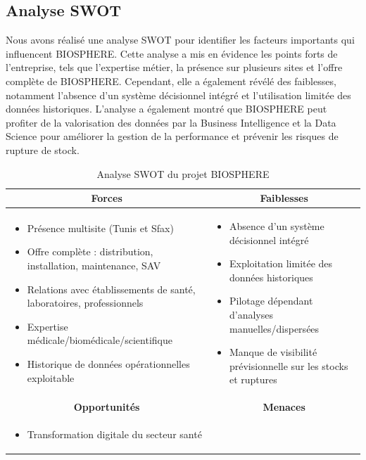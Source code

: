 \subsection{Analyse SWOT}
Nous avons réalisé une analyse SWOT pour identifier les facteurs importants qui influencent BIOSPHERE. Cette analyse a mis en évidence les points forts de l'entreprise, tels que l'expertise métier, la présence sur plusieurs sites et l'offre complète de BIOSPHERE. Cependant, elle a également révélé des faiblesses, notamment l'absence d'un système décisionnel intégré et l'utilisation limitée des données historiques. 
L'analyse a également montré que BIOSPHERE peut profiter de la valorisation des données par la Business Intelligence et la Data Science pour améliorer la gestion de la performance et prévenir les risques de rupture de stock.
\begin{table}[H]
\centering
\caption{Analyse SWOT du projet BIOSPHERE}
\label{tab:ch1:swot}
\begin{tabular}{|p{6.5cm}|p{6.5cm}|}
\hline
\multicolumn{1}{|c|}{\textbf{Forces}} & 
\multicolumn{1}{c|}{\textbf{Faiblesses}} \\ 
\hline
\begin{itemize}
    \item Présence multisite (Tunis et Sfax)
    \item Offre complète : distribution, installation, maintenance, SAV
    \item Relations avec établissements de santé, laboratoires, professionnels
    \item Expertise médicale/biomédicale/scientifique
    \item Historique de données opérationnelles exploitable
\end{itemize} & 
\begin{itemize}
    \item Absence d'un système décisionnel intégré
    \item Exploitation limitée des données historiques
    \item Pilotage dépendant d'analyses manuelles/dispersées
    \item Manque de visibilité prévisionnelle sur les stocks et ruptures
\end{itemize} \\ \hline
\multicolumn{1}{|c|}{\textbf{Opportunités}} & 
\multicolumn{1}{c|}{\textbf{Menaces}} \\ 
\hline
\begin{itemize}
    \item Transformation digitale du secteur santé

\end{itemize}
\end{tabular}
\end{table}
